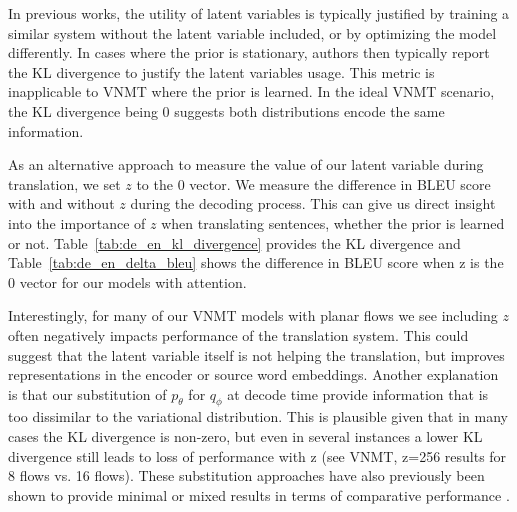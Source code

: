 
In previous works, the utility of latent variables is typically justified by training a similar system without the latent variable included, or by optimizing the model differently.  In cases where the prior is stationary, authors then typically report the KL divergence to justify the latent variables usage. This metric is inapplicable to \ac{VNMT} where the prior is learned. In the ideal \ac{VNMT} scenario, the KL divergence being 0 suggests both distributions encode the same information.

As an alternative approach to measure the value of our latent variable during translation, we set $z$ to the 0 vector. We measure the difference in BLEU score with and without $z$ during the decoding process. This can give us direct insight into the importance of $z$ when translating sentences, whether the prior is learned or not. Table~\ref{tab:de_en_kl_divergence} provides the KL divergence and Table~\ref{tab:de_en_delta_bleu} shows the difference in BLEU score when z is the 0 vector for our models with attention. 

Interestingly, for many of our \ac{VNMT} models with planar flows we see including $z$ often negatively impacts performance of the translation system. This could suggest that the latent variable itself is not helping the translation, but improves representations in the encoder or source word embeddings. Another explanation is that our substitution of $p_{\theta}$ for $q_{\phi}$ at decode time provide information that is too dissimilar to the variational distribution. This is plausible given that in many cases the KL divergence is non-zero, but even in several instances a lower KL divergence still leads to loss of performance with z (see \ac{VNMT}, z=256 results for 8 flows vs. 16 flows). These substitution approaches have also previously been shown to provide minimal or mixed results in terms of comparative performance \cite{eikema2018AEVNMT}.

